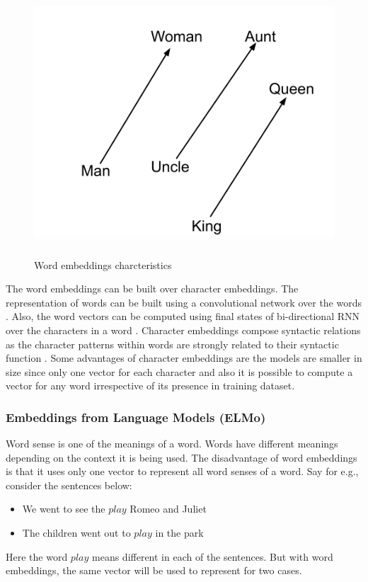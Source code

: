 \documentclass[a4paper, 11pt]{article}
\begin{document}
\begin{figure}[H]
    \centering
    \includegraphics[width=\textwidth,height=10cm,keepaspectratio=true]
    {word2vec-gender-relation.png}
    \caption{
        Word embeddings charcteristics
    }
    \label{fig:word_properties}
\end{figure}


The word embeddings can be built over character embeddings. The representation of words can be built using a convolutional network over the words \parencite{dos2014deep}. Also, the word vectors can be computed using final states of bi-directional RNN over the characters in a word \parencite{ling-etal-2015-finding}. Character embeddings compose syntactic relations as the character patterns within words are strongly related to their syntactic function \parencite{Goldberg2016}. Some advantages of character embeddings are the models are smaller in size since only one vector for each character and also it is possible to compute a vector for any word irrespective of its presence in training dataset. 

\subsubsection{Embeddings from Language Models (ELMo)}
Word sense is one of the meanings of a word. Words have different meanings depending on the context it is being used. The disadvantage of word embeddings is that it uses only one vector to represent all word senses of a word.  Say for e.g., consider the sentences below:
\begin{itemize}
\item We went to see the $play$ Romeo and Juliet
\item The children went out to $play$ in the park
\end{itemize}
Here the word $play$ means different in each of the sentences. But with word embeddings, the same vector will be used to represent for two cases. 
\end{document}
